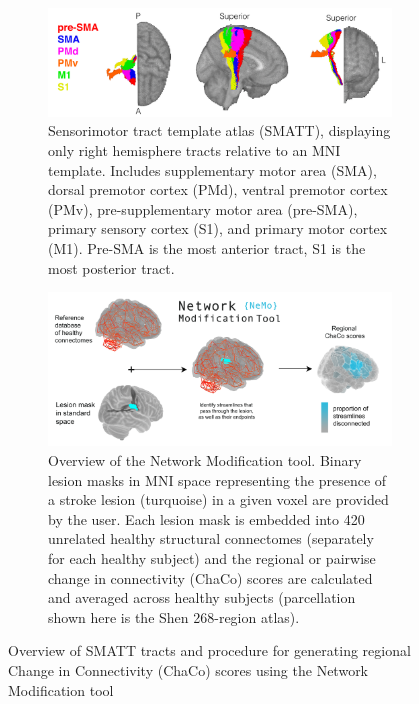 \documentclass[10pt]{article}
\begin{document}
\begin{figure}
\begin{subfigure}{1\textwidth}
   \includegraphics[width=1\linewidth]{figures/SMATT.png}
    \caption{Sensorimotor tract template atlas (SMATT), displaying only right hemisphere tracts relative to an MNI template. Includes supplementary motor area (SMA), dorsal premotor cortex (PMd), ventral premotor cortex (PMv), pre-supplementary motor area (pre-SMA), primary sensory cortex (S1),  and primary motor cortex (M1). Pre-SMA is the most anterior tract, S1 is the most posterior tract.}
    \label{smatt}
  \label{fig:sfig1}
\end{subfigure}
\begin{subfigure}{1\textwidth}
  \includegraphics[width=1\linewidth]{figures/Multi-panelML_white_regional.png}
  \caption{Overview of the Network Modification tool. Binary lesion masks in MNI space representing the presence of a stroke lesion (turquoise) in a given voxel are provided by the user. Each lesion mask is embedded into 420 unrelated healthy structural connectomes (separately for each healthy subject) and the regional or pairwise change in connectivity (ChaCo) scores are calculated and averaged across healthy subjects (parcellation shown here is the Shen 268-region atlas). }
  \label{fig:sfig2}
\end{subfigure}
\caption{Overview of SMATT tracts and procedure for generating regional Change in Connectivity (ChaCo) scores using the Network Modification tool}
\label{smatt_and_chaco}
\end{figure}
\end{document}

